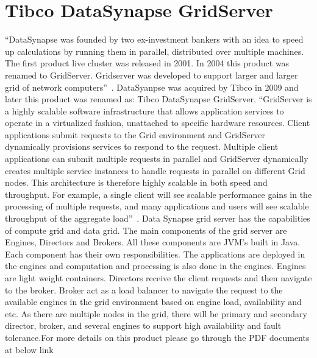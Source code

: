 \section{Tibco DataSynapse GridServer}

“DataSynapse was founded by two ex-investment bankers with an idea to speed up calculations by running them in parallel, 
distributed over multiple machines. The first product live cluster was released in 2001. 
In 2004 this product was renamed to GridServer. Gridserver was developed to support larger 
and larger grid of network computers”~\cite{hid-sp18-514-datasynapsewiki}.
DataSyanpse was acquired by Tibco in 2009 and later this product was renamed as: 
Tibco DataSynapse GridServer\cite{hid-sp18-514-tibcodatasynapsewiki}.
“GridServer is a highly scalable software infrastructure that allows application services to operate in a virtualized fashion, 
unattached to specific hardware resources. Client applications submit requests to the Grid environment 
and GridServer dynamically provisions services to respond to the request. 
Multiple client applications can submit multiple requests in parallel and GridServer dynamically 
creates multiple service instances to handle requests in parallel on different Grid nodes. 
This architecture is therefore highly scalable in both speed and throughput. For example, 
a single client will see scalable performance gains in the processing of multiple requests, 
and many applications and users will see scalable throughput of the aggregate load”~\cite{hid-sp18-514-tibcods}.
Data Synapse grid server has the capabilities of compute grid and data grid. The main components of the grid server are Engines, 
Directors and Brokers. All these components are JVM’s built in Java.  
Each component has their own responsibilities. The applications are deployed in the engines and computation and processing 
is also done in the engines. Engines are light weight containers. Directors receive the client requests 
and then navigate to the broker. Broker act as a load balancer to navigate the request to the available engines 
in the grid environment based on engine load, availability and etc. As there are multiple nodes in the grid, 
there will be primary and secondary director, broker, and several engines to support high availability 
and fault tolerance\cite{hid-sp18-514-tibcods}.For more details on this product 
please go through the PDF documents at below link

